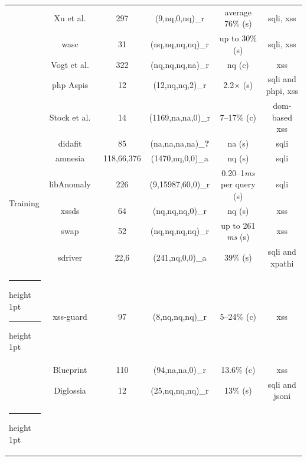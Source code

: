\documentclass[10pt,journal,compsoc]{IEEEtran}
\makeatletter
\newcommand{\xmark}{\ding{56}}
\newcommand{\thickhline}{%
    \noalign {\ifnum 0=`}\fi \hrule height 1pt
    \futurelet \reserved@a \@xhline
}
\makeatother
\begin{document}
\begin{table}[t]
\begin{threeparttable}
\begin{small}
{\begin{tabular}{l|c|c|cc|c}
  &   Xu et al.~\cite{XBS06} & 297 & (9,{\sc nq},0,{\sc nq})\_r & average 76\% ({\sc s}) & {\sc sql}i, {\sc xss} \\ 
  &   {\sc wasc}~\cite{NLC07} & 31 & ({\sc nq},{\sc nq},{\sc nq},{\sc nq})\_r & up to 30\% ({\sc s}) & {\sc sql}i, {\sc xss} \\
  &   Vogt et al.~\cite{VFJKKV07} & 322 & ({\sc nq},{\sc nq},{\sc nq},{\sc na})\_r & {\sc nq} ({\sc c}) & {\sc xss} \\
  &   {\sc php} Aspis~\cite{PMP11} & 12 & (12,{\sc nq},{\sc nq},2)\_r & 2.2$\times$ ({\sc s}) & {\sc sql}i and {\sc php}i, {\sc xss} \\
  &   Stock et al.~\cite{SLMS14} & 14 & (1169,{\sc na},{\sc na},0)\_r & 7--17\% ({\sc c}) & {\sc dom}-based {\sc xss} \\
  \hline 
  \multirow{6}{*}{Training}
  &   {\sc didafit}~\cite{LLW02} & 85 & ({\sc na},{\sc na},{\sc na},{\sc na})\_{\bf ?} & {\sc na} ({\sc s}) & {\sc sql}i \\
  &   {\sc amnesia}~\cite{HO05,HO06,HO05b} & 118,66,376 & (1470,{\sc nq},0,0)\_a & {\sc nq} ({\sc s}) & {\sc sql}i \\ 
  &   libAnomaly~\cite{VMV05} & 226 & (9,15987,60,0)\_r & 0.20--1{\it ms} per query ({\sc s}) & {\sc sql}i \\
  &   {\sc xssds}~\cite{JEP08} & 64 & ({\sc nq},{\sc nq},{\sc nq},0)\_r & {\sc nq} ({\sc s}) & {\sc xss} \\
  &   {\sc swap}~\cite{WPLKK09} & 52 & ({\sc nq},{\sc nq},{\sc nq},{\sc nq})\_r & up to 261 {\it ms} ({\sc s}) & {\sc xss} \\ 
  &   {\sc sd}river~\cite{MS09,MKLS11} & 22,6 & (241,{\sc nq},0,0)\_a & 39\% ({\sc s}) & {\sc sql}i and {\sc xp}athi \\
  \thickhline
  \thickhline
  \multirow{3}{*}{Hybrid}
  &   {\sc xss-guard}~\cite{BV08} & 97 & (8,{\sc nq},{\sc nq},{\sc nq})\_r & 5--24\% ({\sc c}) & {\sc xss} \\
  &   Blueprint~\cite{LV09} & 110 & (94,{\sc na},{\sc na},0)\_r & 13.6\% ({\sc c}) & {\sc xss} \\
  &   Diglossia~\cite{SMS13} & 12 & (25,{\sc nq},{\sc nq},{\sc nq})\_r & 13\% ({\sc s}) & {\sc sql}i and {\sc json}i \\
  \thickhline
    \end{tabular}}
    \begin{tablenotes}

\end{tablenotes}
\end{small}
\end{threeparttable}
\end{table}
\end{document}
